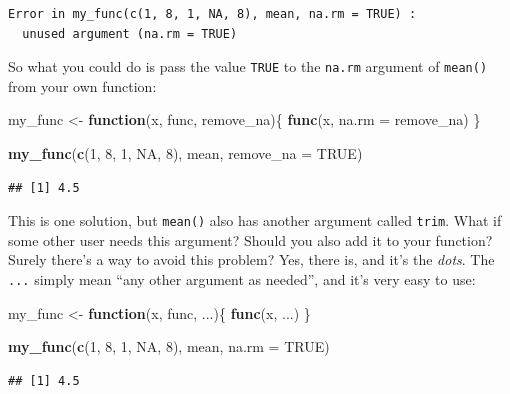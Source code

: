 \documentclass[]{gitbook}
\newenvironment{Shaded}{\begin{snugshade}}{\end{snugshade}}
\newcommand{\ControlFlowTok}[1]{\textcolor[rgb]{0.13,0.29,0.53}{\textbf{#1}}}
\newcommand{\DataTypeTok}[1]{\textcolor[rgb]{0.13,0.29,0.53}{#1}}
\newcommand{\DecValTok}[1]{\textcolor[rgb]{0.00,0.00,0.81}{#1}}
\newcommand{\KeywordTok}[1]{\textcolor[rgb]{0.13,0.29,0.53}{\textbf{#1}}}
\newcommand{\NormalTok}[1]{#1}
\newcommand{\OtherTok}[1]{\textcolor[rgb]{0.56,0.35,0.01}{#1}}
\newcommand{\StringTok}[1]{\textcolor[rgb]{0.31,0.60,0.02}{#1}}
\begin{document}
\begin{verbatim}
Error in my_func(c(1, 8, 1, NA, 8), mean, na.rm = TRUE) :
  unused argument (na.rm = TRUE)
\end{verbatim}

So what you could do is pass the value \texttt{TRUE} to the \texttt{na.rm} argument of \texttt{mean()} from your own
function:

\begin{Shaded}
\begin{Highlighting}[]
\NormalTok{my_func <-}\StringTok{ }\ControlFlowTok{function}\NormalTok{(x, func, remove_na)\{}
  \KeywordTok{func}\NormalTok{(x, }\DataTypeTok{na.rm =}\NormalTok{ remove_na)}
\NormalTok{\}}

\KeywordTok{my_func}\NormalTok{(}\KeywordTok{c}\NormalTok{(}\DecValTok{1}\NormalTok{, }\DecValTok{8}\NormalTok{, }\DecValTok{1}\NormalTok{, }\OtherTok{NA}\NormalTok{, }\DecValTok{8}\NormalTok{), mean, }\DataTypeTok{remove_na =} \OtherTok{TRUE}\NormalTok{)}
\end{Highlighting}
\end{Shaded}

\begin{verbatim}
## [1] 4.5
\end{verbatim}

This is one solution, but \texttt{mean()} also has another argument called \texttt{trim}. What if some other
user needs this argument? Should you also add it to your function? Surely there's a way to avoid
this problem? Yes, there is, and it's the \emph{dots}. The \texttt{...} simply mean ``any other
argument as needed'', and it's very easy to use:

\begin{Shaded}
\begin{Highlighting}[]
\NormalTok{my_func <-}\StringTok{ }\ControlFlowTok{function}\NormalTok{(x, func, ...)\{}
  \KeywordTok{func}\NormalTok{(x, ...)}
\NormalTok{\}}

\KeywordTok{my_func}\NormalTok{(}\KeywordTok{c}\NormalTok{(}\DecValTok{1}\NormalTok{, }\DecValTok{8}\NormalTok{, }\DecValTok{1}\NormalTok{, }\OtherTok{NA}\NormalTok{, }\DecValTok{8}\NormalTok{), mean, }\DataTypeTok{na.rm =} \OtherTok{TRUE}\NormalTok{)}
\end{Highlighting}
\end{Shaded}

\begin{verbatim}
## [1] 4.5
\end{verbatim}
\end{document}
